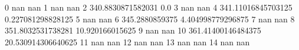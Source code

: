 0 nan nan
1 nan nan
2 340.8830871582031 0.0
3 nan nan
4 341.11016845703125 0.227081298828125
5 nan nan
6 345.2880859375 4.404998779296875
7 nan nan
8 351.8032531738281 10.920166015625
9 nan nan
10 361.41400146484375 20.530914306640625
11 nan nan
12 nan nan
13 nan nan
14 nan nan
